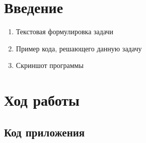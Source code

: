 \documentclass[12pt,a4paper]{scrartcl}
\begin{document}
\section{Введение}
\label{sec:intro}

\begin{enumerate}
 \item Текстовая формулировка задачи
 \item Пример кода, решающего данную задачу
 \item Скриншот программы
\end{enumerate}
\section{Ход работы}
\label{sec:exp}
\subsection{Код приложения}
\label{sec:exp:code}
\end{document}
